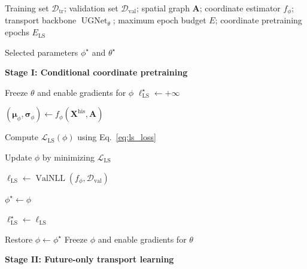 \documentclass[sigconf, anonymous, review]{acmart}
\begin{document}
\begin{algorithm}[h]
\caption{Two-Stage Training of FAST-STG}
\label{alg:training}
\begin{algorithmic}[1]

\Require Training set $\mathcal{D}_{\mathrm{tr}}$;
validation set $\mathcal{D}_{\mathrm{val}}$;
spatial graph $\mathbf{A}$;
coordinate estimator $f_{\phi}$;
transport backbone $\operatorname{UGNet}_{\theta}$;
maximum epoch budget $E$;
coordinate pretraining epochs $E_{\mathrm{LS}}$

\Ensure Selected parameters $\phi^{\star}$ and $\theta^{\star}$

\Statex
\Statex \textbf{Stage I: Conditional coordinate pretraining}

\State Freeze $\theta$ and enable gradients for $\phi$
\State $\ell_{\mathrm{LS}}^{\star}\gets+\infty$



        \State $(\boldsymbol{\mu}_{\phi},
        \boldsymbol{\sigma}_{\phi})
        \gets
        f_{\phi}
        (\mathbf{X}^{\mathrm{his}},\mathbf{A})$

        \State Compute $\mathcal{L}_{\mathrm{LS}}(\phi)$
        using Eq.~\eqref{eq:ls_loss}

        \State Update $\phi$ by minimizing
        $\mathcal{L}_{\mathrm{LS}}$

    \EndFor

    \State $\ell_{\mathrm{LS}}
    \gets
    \operatorname{ValNLL}
    (f_{\phi},\mathcal{D}_{\mathrm{val}})$


        \State $\phi^{\star}\gets\phi$

        \State $\ell_{\mathrm{LS}}^{\star}
        \gets\ell_{\mathrm{LS}}$

    \EndIf

\EndFor

\State Restore $\phi\gets\phi^{\star}$
\State Freeze $\phi$ and enable gradients for $\theta$

\Statex
\Statex \textbf{Stage II: Future-only transport learning}




\end{algorithmic}
\end{algorithm}
\end{document}
